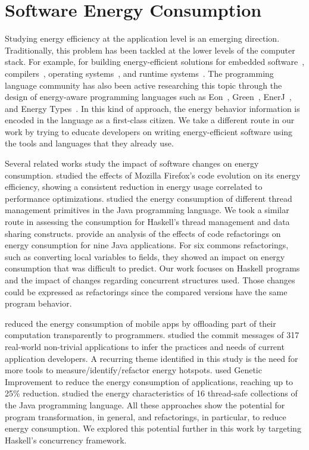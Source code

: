 \section{Software Energy Consumption}
Studying energy efficiency at the application level is an emerging direction. Traditionally, this problem has been tackled at the lower levels of the computer stack. For example, for building energy-efficient solutions for embedded software~\cite{tiwari:1994}, compilers~\cite{hsu:2003}, operating systems~\cite{merkel:2006}, and runtime systems~\cite{ribic:2014, farkas:2000}. The programming language community has also been active researching this topic through the design of energy-aware programming languages such as Eon~\cite{sorber:2007}, Green~\cite{baek:2010}, EnerJ~\cite{sampson:2011}, and Energy Types~\cite{cohen:2012}. In this kind of approach, the energy behavior information is encoded in the language as a first-class citizen. We take a different route in our work by trying to educate developers on writing energy-efficient software using the tools and languages that they already use.

Several related works study the impact of software changes on energy consumption.  studied the effects of Mozilla Firefox's code evolution on its energy efficiency, showing a consistent reduction in energy usage correlated to performance optimizations.  studied the energy consumption of different thread management primitives in the Java programming language. We took a similar route in assessing the consumption for Haskell's thread management and data sharing constructs.  provide an analysis of the effects of code refactorings on energy consumption for nine Java applications. For six commons refactorings, such as converting local variables to fields, they showed an impact on energy consumption that was difficult to predict. Our work focuses on Haskell programs and the impact of changes regarding concurrent structures used. Those changes could be expressed as refactorings since the compared versions have the same program behavior.

 reduced the energy consumption of mobile apps by offloading part of their computation transparently to programmers.  studied the commit messages of 317 real-world non-trivial applications to infer the practices and needs of current application developers. A recurring theme identified in this study is the need for more tools to measure/identify/refactor energy hotspots.  used Genetic Improvement to reduce the energy consumption of applications, reaching up to 25\% reduction.  studied the energy characteristics of 16 thread-safe collections of the Java programming language. All these approaches show the potential for program transformation, in general, and refactorings, in particular, to reduce energy consumption. We explored this potential further in this work by targeting Haskell's concurrency framework.


